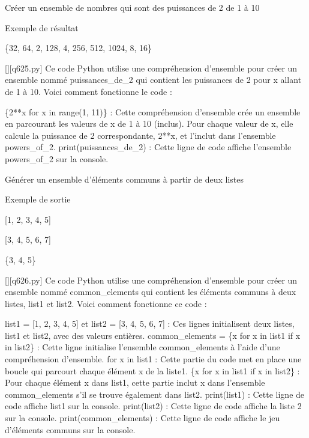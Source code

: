         \question
        Créer un ensemble de nombres qui sont des puissances de 2 de 1 à 10

Exemple de résultat

\{32, 64, 2, 128, 4, 256, 512, 1024, 8, 16\}
        \par
        \begin{solution}
            \renewcommand{\nomfichier}{q625.py}
            \pythonfile{\chemincode \nomfichier}[][\nomfichier]
            Ce code Python utilise une compréhension d'ensemble pour créer un ensemble nommé puissances\_de\_2 qui contient les puissances de 2 pour x allant de 1 à 10. Voici comment fonctionne le code :

    \{2**x for x in range(1, 11)\} : Cette compréhension d'ensemble crée un ensemble en parcourant les valeurs de x de 1 à 10 (inclus). Pour chaque valeur de x, elle calcule la puissance de 2 correspondante, 2**x, et l'inclut dans l'ensemble powers\_of\_2.
    print(puissances\_de\_2) : Cette ligne de code affiche l'ensemble powers\_of\_2 sur la console.
        \end{solution}
        

        \question
        Générer un ensemble d'éléments communs à partir de deux listes

Exemple de sortie

[1, 2, 3, 4, 5]

[3, 4, 5, 6, 7]

\{3, 4, 5\}
        \par
        \begin{solution}
            \renewcommand{\nomfichier}{q626.py}
            \pythonfile{\chemincode \nomfichier}[][\nomfichier]
            Ce code Python utilise une compréhension d'ensemble pour créer un ensemble nommé common\_elements qui contient les éléments communs à deux listes, list1 et list2. Voici comment fonctionne ce code :

    list1 = [1, 2, 3, 4, 5] et list2 = [3, 4, 5, 6, 7] : Ces lignes initialisent deux listes, list1 et list2, avec des valeurs entières.
    common\_elements = \{x for x in list1 if x in list2\} : Cette ligne initialise l'ensemble common\_elements à l'aide d'une compréhension d'ensemble.
        for x in list1 : Cette partie du code met en place une boucle qui parcourt chaque élément x de la liste1.
        \{x for x in list1 if x in list2\} : Pour chaque élément x dans list1, cette partie inclut x dans l'ensemble common\_elements s'il se trouve également dans list2.
    print(list1) : Cette ligne de code affiche list1 sur la console.
    print(list2) : Cette ligne de code affiche la liste 2 sur la console.
    print(common\_elements) : Cette ligne de code affiche le jeu d'éléments communs sur la console.
        \end{solution}
        


